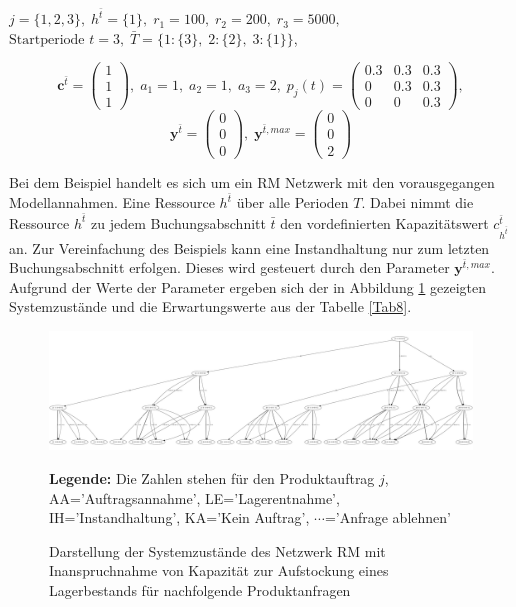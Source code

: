 \begin{center}
$j = \{1, 2, 3\}, \; h^{\bar{t}} = \{1\}, \; r_{1} = 100, \; r_{2} = 200, \; r_{3} = 5000,$ \\
$\text{Startperiode } t=3, \; \bar{T}= \{1: \{3\},\; 2: \{2\},\;3: \{1\} \} $,
\end{center}
\[
    \textbf{c}^{\bar{t}}=\begin{pmatrix} 1\\ 1\\ 1  \end{pmatrix}, \;
    a_{1}=1, \;
     a_{2}=1, \;
       a_{3}=2, \;
            p_{j}(t)=
       \begin{pmatrix}
       0.3 & 0.3 & 0.3 \\
0 & 0.3 & 0.3 \\
0 & 0 & 0.3
\end{pmatrix}, 
  \]
  \[
    \textbf{y}^{\bar{t}}= \begin{pmatrix} 0\\ 0\\ 0  \end{pmatrix}, \;
    \textbf{y}^{\bar{t},max}=\begin{pmatrix} 0\\ 0\\ 2  \end{pmatrix}
      \]

Bei dem Beispiel handelt es sich um ein RM Netzwerk mit den vorausgegangen Modellannahmen. Eine Ressource $h^{\bar{t}}$ über alle Perioden $T$. Dabei nimmt die Ressource $h^{\bar{t}}$ zu jedem Buchungsabschnitt $\bar{t}$ den vordefinierten Kapazitätswert $c^{\bar{t}}_{h^{\bar{t}}}$ an. Zur Vereinfachung des Beispiels kann eine Instandhaltung nur zum letzten Buchungsabschnitt erfolgen. Dieses wird gesteuert durch den Parameter $\textbf{y}^{\bar{t},max}$. Aufgrund der Werte der Parameter ergeben sich der in Abbildung \ref{B8} gezeigten Systemzustände und die Erwartungswerte aus der Tabelle \ref{Tab8}.

\begin{figure}[h!]
  \begin{center}
    \includegraphics[width=200mm, angle=90]{Bilder/Beispiel8.pdf}
    \caption{Darstellung der Systemzustände des Netzwerk RM mit Inanspruchnahme von Kapazität zur Aufstockung eines Lagerbestands für nachfolgende Produktanfragen}  \label{B8}
    {\footnotesize \textbf{Legende:} Die Zahlen stehen für den Produktauftrag $j$, AA='Auftragsannahme', LE='Lagerentnahme', IH='Instandhaltung', KA='Kein Auftrag', $\cdots$='Anfrage ablehnen'} 
  \end{center}
\end{figure}

